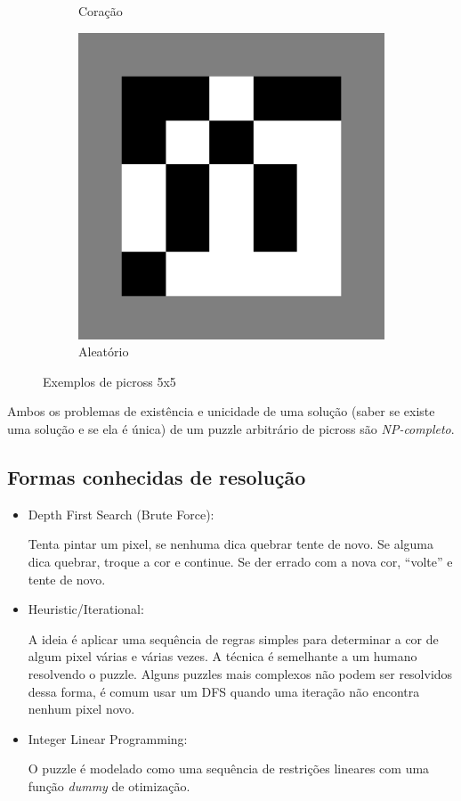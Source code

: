 \documentclass{article}
\begin{document}
\begin{figure}[h]
\begin{subfigure}{0.3\textwidth}
        \caption{Coração}
        \label{p:heart}
    \end{subfigure}
    \begin{subfigure}{0.3\textwidth}
        \centering
        \includegraphics[width=0.9\linewidth]{random5-border}
        \caption{Aleatório}
        \label{p:random5}
    \end{subfigure}
    \caption{Exemplos de picross 5x5}
    \label{pg:5x5}
\end{figure}

Ambos os problemas de existência e unicidade de uma solução
(saber se existe uma solução e se ela é única)
de um puzzle arbitrário de picross são \emph{NP-completo}.

\subsection{Formas conhecidas de resolução}
\begin{itemize}
    \item Depth First Search (Brute Force): \par
        Tenta pintar um pixel,
        se nenhuma dica quebrar tente de novo.
        Se alguma dica quebrar, troque a cor e continue.
        Se der errado com a nova cor, ``volte'' e tente de novo.
    \item Heuristic/Iterational: \par
        A ideia é aplicar uma sequência de regras simples
        para determinar a cor de algum pixel
        várias e várias vezes.
        A técnica é semelhante a um humano resolvendo o puzzle.
        Alguns puzzles mais complexos
        não podem ser resolvidos dessa forma,
        é comum usar um DFS quando
        uma iteração não encontra nenhum pixel novo.
    \item Integer Linear Programming: \par
        O puzzle é modelado como
        uma sequência de restrições lineares
        com uma função \emph{dummy} de otimização.
\end{itemize}
\end{document}
